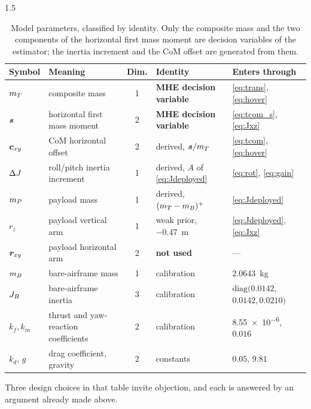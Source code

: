 \begin{spacing}{1.5}
\begin{table}[ht]
\caption{Model parameters, classified by identity. Only the composite mass and
the two components of the horizontal first mass moment are decision variables of
the estimator; the inertia increment and the CoM offset are generated from them.}
\label{tab:params}
\centering
\footnotesize
\begin{tabular}{@{}l p{} c p{} p{}@{}}
\toprule
Symbol & Meaning & Dim. & Identity & Enters through \\
\midrule
$m_T$ & composite mass & 1 & \textbf{MHE decision variable} & \eqref{eq:trans}, \eqref{eq:hover} \\
$\bm{s}$ & horizontal first mass moment & 2 & \textbf{MHE decision variable} & \eqref{eq:tcom_s}, \eqref{eq:Jxz} \\
\midrule
$\bm{c}_{xy}$ & CoM horizontal offset & 2 & derived, $\bm{s}/m_T$ & \eqref{eq:tcom}, \eqref{eq:hover} \\
$\Delta J$ & roll/pitch inertia increment & 1 & derived, $A$ of \eqref{eq:Jdeployed} & \eqref{eq:rot}, \eqref{eq:gain} \\
$m_P$ & payload mass & 1 & derived, $(m_T-m_B)^{+}$ & \eqref{eq:Jdeployed} \\
\midrule
$r_z$ & payload vertical arm & 1 & weak prior, \SI{-0.47}{\meter} & \eqref{eq:Jdeployed}, \eqref{eq:Jxz} \\
$\bm{r}_{xy}$ & payload horizontal arm & 2 & \textbf{not used} & --- \\
\midrule
$m_B$ & bare-airframe mass & 1 & calibration & \SI{2.0643}{\kg} \\
$J_B$ & bare-airframe inertia & 3 & calibration & $\mathrm{diag}(0.0142,$ $0.0142, 0.0210)$ \\
$k_f, k_m$ & thrust and yaw-reaction coefficients & 2 & calibration & \SI{8.55e-6}{}, $0.016$ \\
$k_d$, $g$ & drag coefficient, gravity & 2 & constants & $0.05$, $9.81$ \\
\bottomrule
\end{tabular}
\end{table}

Three design choices in that table invite objection, and each is answered by an
argument already made above.


\end{spacing}

